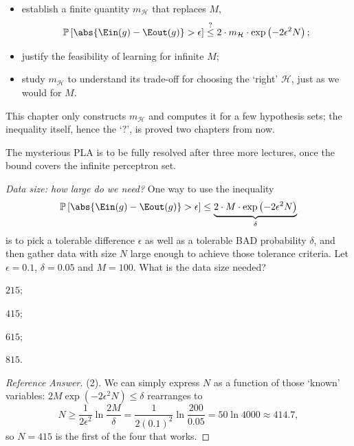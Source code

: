 \begin{itemize}
    \item establish a finite quantity \(m_{\mathcal{H}}\) that replaces \(M\),
        \begin{equation}\label{eq:wish}
            \mathbb{P}\left[ \abs{\Ein(g) - \Eout(g)} > \epsilon \right]
            \overset{?}{\le} 2 \cdot m_{\mathcal{H}} \cdot
            \exp \left( -2 \epsilon^2 N \right) ;
        \end{equation}
    \item justify the feasibility of learning for infinite \(M\);
    \item study \(m_{\mathcal{H}}\) to understand its trade-off for choosing the
        `right' \(\mathcal{H}\), just as we would for \(M\).
\end{itemize}

This chapter only constructs \(m_{\mathcal{H}}\) and computes it for a few
hypothesis sets; the inequality itself, hence the `\(?\)', is proved two
chapters from now.

\begin{note}
    The mysterious PLA is to be fully resolved after three more lectures, once
    the bound covers the infinite perceptron set.
\end{note}

\begin{exercise}
    \emph{Data size: how large do we need?} One way to use the inequality
    \[
        \mathbb{P}\left[ \abs{\Ein(g) - \Eout(g)} > \epsilon \right]
        \le \underbrace{2 \cdot M \cdot \exp \left( -2 \epsilon^2 N \right)}_{\delta}
    \]
    is to pick a tolerable difference \(\epsilon\) as well as a tolerable BAD
    probability \(\delta\), and then gather data with size \(N\) large enough to
    achieve those tolerance criteria. Let \(\epsilon = 0.1\),
    \(\delta = 0.05\) and \(M = 100\). What is the data size needed?
    \begin{enumerate*}[(1)]
        \item \(215\); \item \(415\); \item \(615\); \item \(815\).
    \end{enumerate*}
\end{exercise}

\begin{proof}[Reference Answer]
    (2). We can simply express \(N\) as a function of those `known' variables:
    \(2M \exp(-2\epsilon^2 N) \le \delta\) rearranges to
    \[
        N \ge \frac{1}{2\epsilon^2} \ln \frac{2M}{\delta}
        = \frac{1}{2 (0.1)^2} \ln \frac{200}{0.05}
        = 50 \ln 4000 \approx 414.7 ,
    \]
    so \(N = 415\) is the first of the four that works.
\end{proof}

